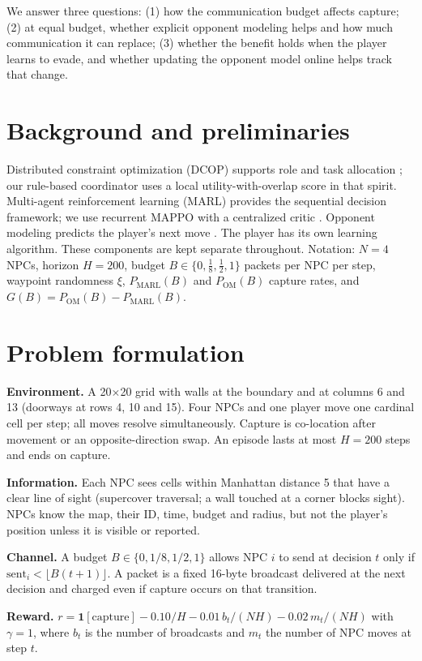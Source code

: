 \documentclass{article}
\begin{document}
We answer three questions: (1) how the communication budget affects capture; (2) at equal budget, whether explicit opponent modeling helps and how much communication it can replace; (3) whether the benefit holds when the player learns to evade, and whether updating the opponent model online helps track that change.

\section{Background and preliminaries}
Distributed constraint optimization (DCOP) supports role and task allocation \citep{fioretto2018}; our rule-based coordinator uses a local utility-with-overlap score in that spirit. Multi-agent reinforcement learning (MARL) provides the sequential decision framework; we use recurrent MAPPO with a centralized critic \citep{yu2022}. Opponent modeling predicts the player's next move \citep{albrecht2018}. The player has its own learning algorithm. These components are kept separate throughout. Notation: $N=4$ NPCs, horizon $H=200$, budget $B\in\{0,\tfrac18,\tfrac12,1\}$ packets per NPC per step, waypoint randomness $\xi$, $P_{\text{MARL}}(B)$ and $P_{\text{OM}}(B)$ capture rates, and $G(B)=P_{\text{OM}}(B)-P_{\text{MARL}}(B)$.

\section{Problem formulation}
\textbf{Environment.} A 20$\times$20 grid with walls at the boundary and at columns 6 and 13 (doorways at rows 4, 10 and 15). Four NPCs and one player move one cardinal cell per step; all moves resolve simultaneously. Capture is co-location after movement or an opposite-direction swap. An episode lasts at most $H=200$ steps and ends on capture.

\textbf{Information.} Each NPC sees cells within Manhattan distance 5 that have a clear line of sight (supercover traversal; a wall touched at a corner blocks sight). NPCs know the map, their ID, time, budget and radius, but not the player's position unless it is visible or reported.

\textbf{Channel.} A budget $B\in\{0,1/8,1/2,1\}$ allows NPC $i$ to send at decision $t$ only if $\mathrm{sent}_i<\lfloor B(t+1)\rfloor$. A packet is a fixed 16-byte broadcast delivered at the next decision and charged even if capture occurs on that transition.

\textbf{Reward.} $r=\mathbf 1[\text{capture}]-0.10/H-0.01\,b_t/(NH)-0.02\,m_t/(NH)$ with $\gamma=1$, where $b_t$ is the number of broadcasts and $m_t$ the number of NPC moves at step $t$.
\end{document}
